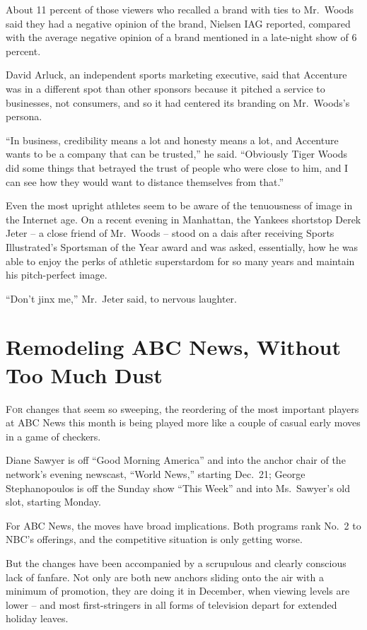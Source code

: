 ﻿\documentclass[12pt]{article}
\begin{document}
About 11 percent of those viewers who recalled a brand with ties to Mr.~Woods said they had a
negative opinion of the brand, Nielsen IAG reported, compared with the average negative opinion of a
brand mentioned in a late-night show of 6 percent.

David Arluck, an independent sports marketing executive, said that Accenture was in a different spot
than other sponsors because it pitched a service to businesses, not consumers, and so it had
centered its branding on Mr.~Woods's persona.

``In business, credibility means a lot and honesty means a lot, and Accenture wants to be a company
that can be trusted,'' he said. ``Obviously Tiger Woods did some things that betrayed the trust of
people who were close to him, and I can see how they would want to distance themselves from that.''

Even the most upright athletes seem to be aware of the tenuousness of image in the Internet age. On
a recent evening in Manhattan, the Yankees shortstop Derek Jeter -- a close friend of Mr.~Woods --
stood on a dais after receiving Sports Illustrated's Sportsman of the Year award and was asked,
essentially, how he was able to enjoy the perks of athletic superstardom for so many years and
maintain his pitch-perfect image.

``Don't jinx me,'' Mr.~Jeter said, to nervous laughter.

\section{Remodeling ABC News, Without Too Much Dust}

\lettrine{F}{or} changes that seem so sweeping, the reordering of the most
important players at ABC News this month is being played more like a couple of casual early moves in
a game of checkers.

Diane Sawyer is off ``Good Morning America'' and into the anchor chair of the network's evening
newscast, ``World News,'' starting Dec.~21; George Stephanopoulos is off the Sunday show ``This
Week'' and into Ms.~Sawyer's old slot, starting Monday.

For ABC News, the moves have broad implications. Both programs rank No.~2 to NBC's offerings, and
the competitive situation is only getting worse.

But the changes have been accompanied by a scrupulous\cite{scrupulous} and clearly conscious lack of
fanfare. Not only are both new anchors sliding onto the air with a minimum of promotion, they are
doing it in December, when viewing levels are lower -- and most first-stringers in all forms of
television depart for extended holiday leaves.
\end{document}

